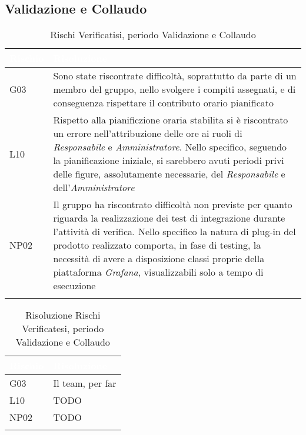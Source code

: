 \subsection{Validazione e Collaudo}\label{ARCollaudo}
\begin{longtable}{|C{.15\textwidth}|C{.79\textwidth}|}
	\hline
	\textbf{\textcolor{white}{Rischio}} & \textbf{\textcolor{white}{Risoluzione}} \\
	\hline \hline
	\endfirsthead
	G03 & Sono state riscontrate difficoltà, soprattutto da parte di un membro del gruppo, nello svolgere i compiti assegnati, e di conseguenza rispettare il contributo orario pianificato\\ 
	\hline
	L10 & Rispetto alla pianificzione oraria stabilita si è riscontrato un errore nell'attribuzione delle ore ai ruoli di \textit{Responsabile} e \textit{Amministratore}. Nello specifico, seguendo la pianificazione iniziale, si sarebbero avuti periodi privi delle figure, assolutamente necessarie, del \textit{Responsabile} e dell'\textit{Amministratore}\\
	\hline
	NP02 & Il gruppo ha riscontrato difficoltà non previste per quanto riguarda la realizzazione dei test di integrazione durante l'attività di verifica. Nello specifico la natura di plug-in del prodotto realizzato comporta, in fase di testing, la necessità di avere a disposizione classi proprie della piattaforma \textit{Grafana}, visualizzabili solo a tempo di esecuzione\\
	\hline
	\caption{Rischi Verificatisi, periodo Validazione e Collaudo}
	\label{tab:analisiRischiRQ}
\end{longtable}

\begin{longtable}{|C{.15\textwidth}|C{.79\textwidth}|}
	\hline
	\textbf{\textcolor{white}{Rischio}} & \textbf{\textcolor{white}{Risoluzione}} \\
	\hline \hline
	\endfirsthead
	G03 & Il team, per far \\ 
	\hline
	L10 & TODO\\
	\hline
	NP02 & TODO\\
	\hline
	\caption{Risoluzione Rischi Verificatesi, periodo Validazione e Collaudo}
	\label{tab:risoluzioneRischiRQ}
\end{longtable}

